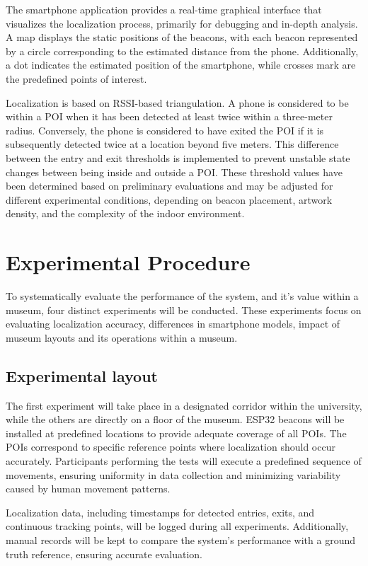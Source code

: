 The smartphone application provides a real-time graphical interface that visualizes the localization process, primarily for debugging and in-depth analysis. A map displays the static positions of the beacons, with each beacon represented by a circle corresponding to the estimated distance from the phone. Additionally, a dot indicates the estimated position of the smartphone, while crosses mark are the predefined points of interest.

Localization is based on RSSI-based triangulation. A phone is considered to be within a POI when it has been detected at least twice within a three-meter radius. Conversely, the phone is considered to have exited the POI if it is subsequently detected twice at a location beyond five meters. This difference between the entry and exit thresholds is implemented to prevent unstable state changes between being inside and outside a POI. These threshold values have been determined based on preliminary evaluations and may be adjusted for different experimental conditions, depending on beacon placement, artwork density, and the complexity of the indoor environment.

\section{Experimental Procedure}

To systematically evaluate the performance of the system, and it's value within a museum, four distinct experiments will be conducted. These experiments focus on evaluating localization accuracy, differences in smartphone models, impact of museum layouts and its operations within a museum.

\subsection{Experimental layout}

The first experiment will take place in a designated corridor within the university, while the others are directly on a floor of the museum. ESP32 beacons will  be installed at predefined locations to provide adequate coverage of all POIs. The POIs correspond to specific reference points where localization should occur accurately. Participants performing the tests will execute a predefined sequence of movements, ensuring uniformity in data collection and minimizing variability caused by human movement patterns.

Localization data, including timestamps for detected entries, exits, and continuous tracking points, will be logged during all experiments. Additionally, manual records will be kept to compare the system's performance with a ground truth reference, ensuring accurate evaluation.

